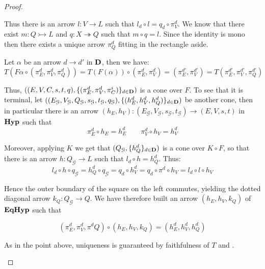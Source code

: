 \documentclass[a4paper,UKenglish,cleveref,pdftex,thm-restate,numberwithinsect]{lipics-v2021}
\def\D{\textbf {\textup{D}}}
\newcommand{\catname}[1]{\textbf{\textup{#1}}}
\newcommand{\hyp}{\catname{Hyp}}
\newcommand{\EqHyp}{\catname{EqHyp}} %
\newcommand{\mto}{\rightarrowtail}
\newcommand{\eto}{\twoheadrightarrow}
\newcommand{\id}[1]{\mathsf{id}_{#1}}
\begin{document}
\begin{proof}
\begin{enumerate}
\noindent 
\parbox{9.5cm}{Thus there is an arrow $l\colon V\to L$ such that $l_d\circ l=q_d\circ \pi^d_V$. We know that there exist $m\colon Q\mto L$ and $q\colon X\eto Q $ such that $m\circ q=l$. Since the identity is mono then there exists a unique arrow $\pi^d_Q$ fitting in the rectangle aside.} 	\hfill \parbox{3cm}{\xymatrix{
	V\ar[r]^{\pi_V^d}\ar@{>>}[d]_{q}&V_d\ar@{>>}[r]^{q_d}&Q_d\ar[d]^{\id{Q_d}}\\Q\ar@{>->}[r]_{m}\ar@{.>}[urr]_{\pi_Q^d}&L\ar[r]_{l_d}&{Q_d}
	}}
	
	Let $\alpha$ be an arrow $d\to d'$ in $\D$, then we have:
		\[T(F\alpha\circ (\pi^d_{E}, \pi^d_V, \pi^d_Q))=T(F(\alpha))\circ (\pi^d_E, \pi^d_V)=(\pi^{d'}_E, \pi^{d'}_V)=T(\pi^{d'}_{E}, \pi^{d'}_V, \pi^{d'}_Q)\]
	
	
	
	
		Thus, $((E, V, C, s, t, q), \{(\pi_E^d, \pi_V^d, \pi_C^i)\}_{d\in \D})$ is a cone over $F$. To see that it is terminal, let $((E_\mathcal{G},V_\mathcal{G}, Q_{\mathcal{G}}, s_{\mathcal{G}}, t_{\mathcal{G}}, q_{\mathcal{G}}), \{(h^d_E, h^d_V, h^d_Q)\}_{d\in \D})$ be another cone, then in particular there is an arrow $(h_E, h_V)\colon (E_\mathcal{G},V_\mathcal{G},  s_{\mathcal{G}}, t_{\mathcal{G}})\to (E, V, s, t)$ in $\hyp$ such that
		\[\pi^d_E\circ h_E=h^d_E \qquad \pi^d_V\circ h_V=h^d_V\]

		Moreover, applying $K$ we get that $(Q_{\mathcal{G}}, \{h^d_{Q}\}_{d\in \D})$ is a cone over $K\circ F$, so that there is an arrow $h\colon Q_{\mathcal{G}} \to L$ such that $l_d\circ h=h^d_{Q}$.  Thus:
		\[l_d\circ h\circ q_\mathcal{G}=h^d_Q\circ q_{\mathcal{G}}=q_{d}\circ h^d_V=q_d\circ \pi^d\circ h_V=l_d\circ l\circ h_V\]

\noindent 
\parbox{2cm}{}\hfill \parbox{9.5cm}{Hence the  outer boundary of the square on the left commutes, yielding the dotted diagonal arrow $k_Q\colon Q_\mathcal{G}\to Q$.  We have therefore built an arrow $(h_E, h_V, k_Q)$ of $\EqHyp$ such that}
\[(\pi^d_E, \pi^d_V, \pi^dQ)\circ (h_E, h_V, k_Q)=(h^d_E, h^d_V, h^d_Q)\] 

As in the point above, uniqueness is guaranteed by faithfulness of $T$ and .	\qedhere 
	\end{enumerate}
\end{proof}
\end{document}
